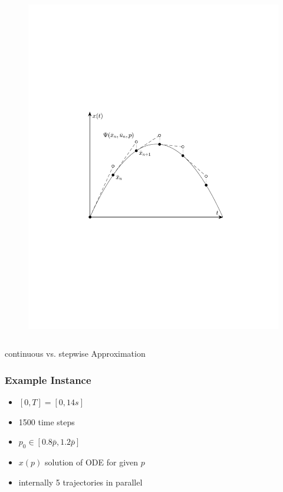 \begin{frame}
\begin{columns}[t]
\begin{figure}
                \includegraphics[trim=3cm 7cm 3cm 9cm, clip=true, width=\linewidth]{img/stepExplEulerPlot}
            \end{figure}
    \end{columns}
    \begin{center}
        continuous vs. stepwise Approximation
    \end{center}
\end{frame}

\begin{frame}
    \frametitle{Example Instance}
    \begin{itemize}
        \item{$[0,T] = [0,14s]$}
        \item{1500 time steps}
        \item{$p_0 \in [0.8  \bar{p}, 1.2  \bar{p}]$}
        \item{$x(p)$ solution of ODE for given $p$}
        \item{internally 5 trajectories in parallel}
    \end{itemize}

\end{frame}

